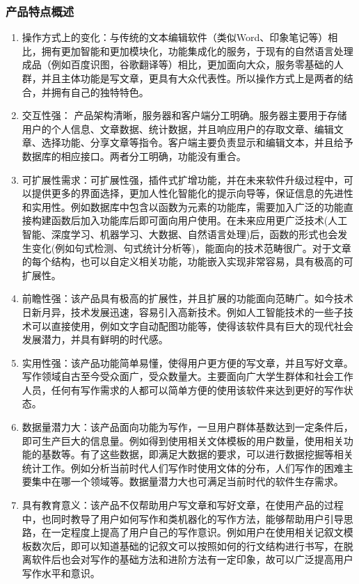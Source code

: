 \documentclass[10pt,letterpaper]{article}
\begin{document}
\subsubsection{产品特点概述}
\begin{enumerate}
\item 	操作方式上的变化：与传统的文本编辑软件（类似Word、印象笔记等）相比，拥有更加智能和更加模块化，功能集成化的服务，于现有的自然语言处理成品（例如百度识图，谷歌翻译等）相比，更加面向大众，服务零基础的人群，并且主体功能是写文章，更具有大众代表性。所以操作方式上是两者的结合，并拥有自己的独特特色。
\item 	交互性强： 产品架构清晰，服务器和客户端分工明确。服务器主要用于存储用户的个人信息、文章数据、统计数据，并且响应用户的存取文章、编辑文章、选择功能、分享文章等指令。客户端主要负责显示和编辑文本，并且给予数据库的相应接口。两者分工明确，功能没有重合。
\item 	可扩展性需求：可扩展性强，插件式扩增功能，并在未来软件升级过程中，可以提供更多的界面选择，更加人性化智能化的提示向导等，保证信息的先进性和实用性。例如数据库中包含以函数为元素的功能库，需要加入广泛的功能直接构建函数后加入功能库后即可面向用户使用。在未来应用更广泛技术(人工智能、深度学习、机器学习、大数据、自然语言处理)后，函数的形式也会发生变化(例如句式检测、句式统计分析等)，能面向的技术范畴很广。对于文章的每个结构，也可以自定义相关功能，功能嵌入实现非常容易，具有极高的可扩展性。
\item 	前瞻性强：该产品具有极高的扩展性，并且扩展的功能面向范畴广。如今技术日新月异，技术发展迅速，容易引入高新技术。例如人工智能技术的一些子技术可以直接使用，例如文字自动配图功能等，使得该软件具有巨大的现代社会发展潜力，并具有鲜明的时代感。
\item 	实用性强：该产品功能简单易懂，使得用户更方便的写文章，并且写好文章。写作领域自古至今受众面广，受众数量大。主要面向广大学生群体和社会工作人员，任何有写作需求的人都可以简单方便的使用该软件来达到更好的写作状态。
\item 	数据量潜力大：该产品面向功能为写作，一旦用户群体基数达到一定条件后，即可生产巨大的信息量。例如得到使用相关文体模板的用户数量，使用相关功能的基数等。有了这些数据，即满足大数据的要求，可以进行数据挖掘等相关统计工作。例如分析当前时代人们写作时使用文体的分布，人们写作的困难主要集中在哪一个领域等。数据量潜力大也可满足当前时代的软件生存需求。
\item 	具有教育意义：该产品不仅帮助用户写文章和写好文章，在使用产品的过程中，也同时教导了用户如何写作和类机器化的写作方法，能够帮助用户引导思路，在一定程度上提高了用户自己的写作意识。例如用户在使用相关记叙文模板数次后，即可以知道基础的记叙文可以按照如何的行文结构进行书写，在脱离软件后也会对写作的基础方法和进阶方法有一定印象，故可以广泛提高用户写作水平和意识。
\end{enumerate}
\end{document}
